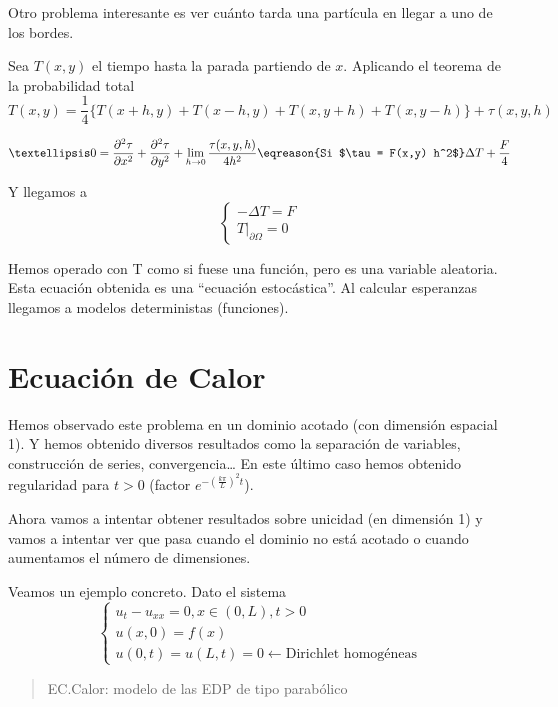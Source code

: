 \begin{example}
		Otro problema interesante es ver cuánto tarda una partícula en llegar a uno de los bordes.

		\noindent Sea $T(x,y)$ el tiempo hasta la parada partiendo de $x$. Aplicando el teorema de la probabilidad total
		\[ T(x,y) = \frac{1}{4} \{ T(x+h,y) + T(x-h,y) + T(x,y+h) + T(x,y-h) \} + \tau(x,y,h)\]

		\[ … 0 = \frac{\partial^2\tau}{\partial x^2} + \frac{\partial^2 \tau}{\partial y^2} + \lim_{h \to 0} \frac{\tau(x,y,h)}{4h^2} \eqreason{Si $\tau = F(x,y) h^2$} \Delta T + \frac{F}{4} \]

		Y llegamos a
		\[ \begin{cases}
			-\Delta T = F \\
			T |_{\partial \Omega} = 0
		\end{cases}\]
		\end{example}
		\obs Hemos operado con T como si fuese una función, pero es una variable aleatoria. Esta ecuación obtenida es una ``ecuación estocástica''. Al calcular esperanzas llegamos a modelos deterministas (funciones).


\section{Ecuación de Calor}

	Hemos observado este problema en un dominio acotado (con dimensión espacial 1). Y hemos obtenido diversos resultados como la separación de variables, construcción de series, convergencia… En este último caso hemos obtenido regularidad para $t > 0$ (factor $e^{-\left(\frac{k \pi}{L}\right)^2 t}$).

	Ahora vamos a intentar obtener resultados sobre unicidad (en dimensión 1) y vamos a intentar ver que pasa cuando el dominio no está acotado o cuando aumentamos el número de dimensiones.

	Veamos un ejemplo concreto. Dato el sistema \[ \begin{cases}
		u_{t} - u_{xx} = 0, x \in (0,L), t > 0 \\
		u(x,0) = f(x) \\
		u(0,t) = u(L,t) = 0 \leftarrow \text{Dirichlet homogéneas}
	 \end{cases}\]

	 \begin{quote}
	 	EC.Calor: modelo de las EDP de tipo parabólico
	 \end{quote}

